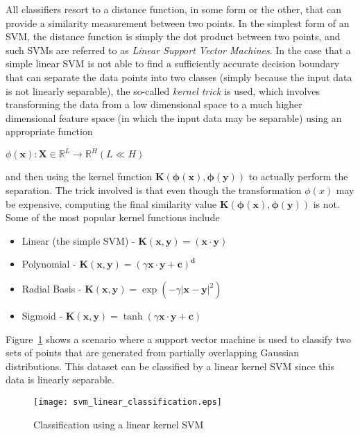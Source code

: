 All classifiers resort to a distance function, in some form or the other, that can provide a similarity measurement between two points. In the simplest form of an SVM, the distance function is simply the dot product between two points, and such SVMs are referred to as \emph{Linear Support Vector Machines}. In the case that a simple linear SVM is not able to find a sufficiently accurate decision boundary that can separate the data points into two classes (simply because the input data is not linearly separable), the so-called \emph{kernel trick} is used, which involves transforming the data from a low dimensional space to a much higher dimensional feature space (in which the input data may be separable) using an appropriate function

\begin{center}
    $\phi(\mathbf{x}): \mathbf{X} \in \mathbb{R}^{L} \rightarrow \mathbb{R}^H (L \ll H)$
\end{center}

and then using the kernel function $\mathbf{K(\phi(x), \phi(y))}$ to actually perform the separation. The trick involved is that even though the transformation $\phi(x)$ may be expensive, computing the final similarity value $\mathbf{K(\phi(x), \phi(y))}$ is not.\\

Some of the most popular kernel functions include
\begin{itemize}
    \item{Linear (the simple SVM) - $\mathbf{K(x, y)} = (\mathbf{x} \cdot \mathbf{y})$ }
    \item{Polynomial - $\mathbf{K(x, y)} = (\gamma \mathbf{x} \cdot \mathbf{y} + \mathbf{c})^{\mathbf{d}}$}
    \item{Radial Basis - $\mathbf{K(x, y)} = \exp(-\gamma {| \mathbf{x} - \mathbf{y} |}^{2})$}
    \item{Sigmoid - $\mathbf{K(x, y)} = \tanh(\gamma \mathbf{x} \cdot \mathbf{y} + \mathbf{c})$}
\end{itemize}

Figure~\ref{fig:svm_linear_classify} shows a scenario where a support vector machine is used to classify two sets of points that are generated from partially overlapping Gaussian distributions. This dataset can be classified by a linear kernel SVM since this data is linearly separable.\\

\begin{figure}[t!]
    \centering
    \texttt{[image: svm\_linear\_classification.eps]}
    \caption{Classification using a linear kernel SVM}
    \label{fig:svm_linear_classify}
\end{figure}

